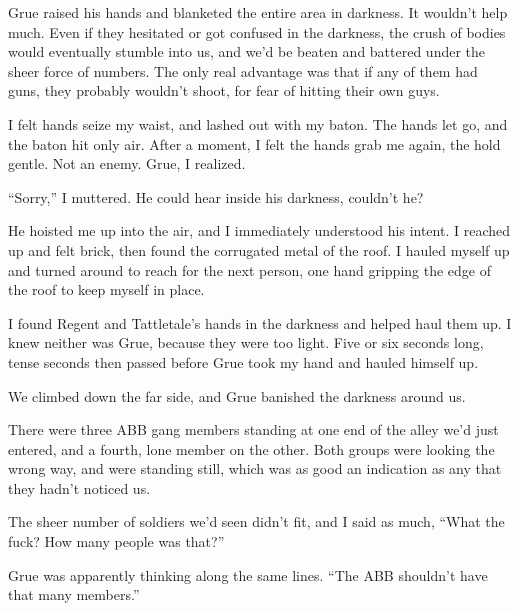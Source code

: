 





Grue raised his hands and blanketed the entire area in darkness.  It wouldn't help much.  Even if they hesitated or got confused in the darkness, the crush of bodies would eventually stumble into us, and we'd be beaten and battered under the sheer force of numbers.  The only real advantage was that if any of them had guns, they probably wouldn't shoot, for fear of hitting their own guys.



I felt hands seize my waist, and lashed out with my baton.  The hands let go, and the baton hit only air.  After a moment, I felt the hands grab me again, the hold gentle.  Not an enemy.  Grue, I realized.



``Sorry,'' I muttered.  He could hear inside his darkness, couldn't he?



He hoisted me up into the air, and I immediately understood his intent.  I reached up and felt brick, then found the corrugated metal of the roof.  I hauled myself up and turned around to reach for the next person, one hand gripping the edge of the roof to keep myself in place.



I found Regent and Tattletale's hands in the darkness and helped haul them up.  I knew neither was Grue, because they were too light.  Five or six seconds long, tense seconds then passed before Grue took my hand and hauled himself up.



We climbed down the far side, and Grue banished the darkness around us.



There were three ABB gang members standing at one end of the alley we'd just entered, and a fourth, lone member on the other.  Both groups were looking the wrong way, and were standing still, which was as good an indication as any that they hadn't noticed us.



The sheer number of soldiers we'd seen didn't fit, and I said as much,  ``What the fuck?  How many people was that?''



Grue was apparently thinking along the same lines. ``The ABB shouldn't have that many members.''



